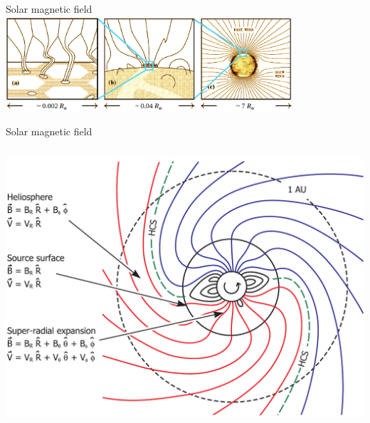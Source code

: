 \begin{frame}[c]{Solar magnetic field}{}
	\includegraphics[width=0.8\textwidth]{../figures_of_others/images/Cranmer2005_fig1_color.png}
\end{frame}
\begin{frame}[c]{Solar magnetic field}{}
	\begin{columns}[c]

	\includegraphics[width=\textwidth]{../figures_of_others/images/Owens2013_PFSS_Sectors_screenshot.png}
	
	
	\end{columns}
\end{frame}
